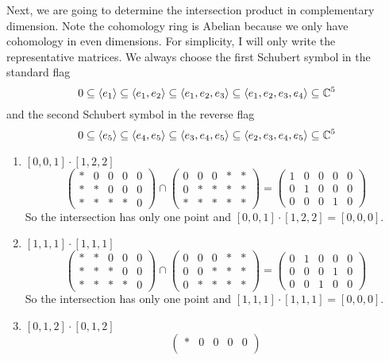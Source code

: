 \documentclass[letterpaper, 12pt]{article}
\begin{document}
\begin{solution}
Next, we are going to determine the intersection product in complementary dimension. Note the cohomology ring is Abelian because we only have cohomology in even dimensions. For simplicity, I will only write the representative matrices. We always choose the first Schubert symbol in the standard flag 
\[0\subseteq \langle e_1\rangle\subseteq \langle e_1,e_2\rangle\subseteq \langle e_1,e_2,e_3\rangle\subseteq \langle e_1,e_2,e_3,e_4\rangle\subseteq \mathbb{C}^5\]
and the second Schubert symbol in the reverse flag
\[0\subseteq \langle e_5\rangle\subseteq \langle e_4,e_5\rangle\subseteq \langle e_3,e_4,e_5\rangle\subseteq \langle e_2,e_3,e_4,e_5\rangle\subseteq \mathbb{C}^5\]
\begin{enumerate}[(1)]
\item \([0,0,1]\cdot [1,2,2]\)\\ 
\[\begin{pmatrix}
   *&0&0&0&0\\ 
   *&*&0&0&0\\
   *&*&*&*&0
\end{pmatrix}\cap \begin{pmatrix}
   0&0&0&*&*\\
   0&*&*&*&*\\ 
   *&*&*&*&*
\end{pmatrix}=\begin{pmatrix}
   1&0&0&0&0\\ 
   0&1&0&0&0\\ 
   0&0&0&1&0
\end{pmatrix}\]
So the intersection has only one point and \([0,0,1]\cdot [1,2,2]=[0,0,0]\).
\item \([1,1,1]\cdot [1,1,1]\)
\[\begin{pmatrix}
   *&*&0&0&0\\ 
   *&*&*&0&0\\
   *&*&*&*&0
\end{pmatrix}\cap \begin{pmatrix}
   0&0&0&*&*\\
   0&0&*&*&*\\ 
   0&*&*&*&*
\end{pmatrix}=\begin{pmatrix}
   0&1&0&0&0\\ 
   0&0&0&1&0\\ 
   0&0&1&0&0
\end{pmatrix}\]
So the intersection has only one point and \([1,1,1]\cdot [1,1,1]=[0,0,0]\).
\item \([0,1,2]\cdot [0,1,2]\)
\[\begin{pmatrix}
   *&0&0&0&0\\ 

\end{pmatrix}\]
\end{enumerate}
\end{solution}
\end{document}
